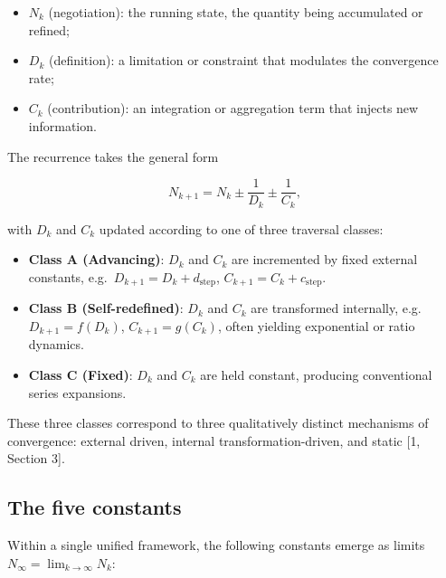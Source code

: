 \documentclass[12pt]{article}
\providecommand{\tightlist}{%
  \setlength{\itemsep}{0pt}\setlength{\parskip}{0pt}}
\begin{document}
\begin{itemize}
\tightlist
\item
  \textbf{\(N_k\)} (negotiation): the running state, the quantity being
  accumulated or refined;
\item
  \textbf{\(D_k\)} (definition): a limitation or constraint that
  modulates the convergence rate;
\item
  \textbf{\(C_k\)} (contribution): an integration or aggregation term
  that injects new information.
\end{itemize}

The recurrence takes the general form

\[
N_{k+1} = N_k \pm \frac{1}{D_k} \pm \frac{1}{C_k},
\]

with \(D_k\) and \(C_k\) updated according to one of three traversal
classes:

\begin{itemize}
\tightlist
\item
  \textbf{Class A (Advancing)}: \(D_k\) and \(C_k\) are incremented by
  fixed external constants, e.g.~\(D_{k+1} = D_k + d_\text{step}\),
  \(C_{k+1} = C_k + c_\text{step}\).
\item
  \textbf{Class B (Self-redefined)}: \(D_k\) and \(C_k\) are transformed
  internally, e.g.~\(D_{k+1} = f(D_k)\), \(C_{k+1} = g(C_k)\), often
  yielding exponential or ratio dynamics.
\item
  \textbf{Class C (Fixed)}: \(D_k\) and \(C_k\) are held constant,
  producing conventional series expansions.
\end{itemize}

These three classes correspond to three qualitatively distinct
mechanisms of convergence: external driven, internal
transformation-driven, and static {[}1, Section 3{]}.

\subsection{The five constants}\label{the-five-constants}

Within a single unified framework, the following constants emerge as
limits \(N_\infty = \lim_{k \to \infty} N_k\):
\end{document}
